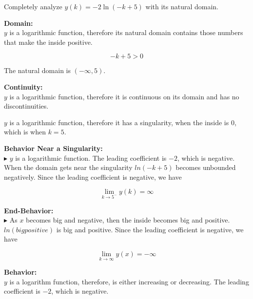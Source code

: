 \documentclass{ximera}
\author{Lee Wayand}
\begin{document}
\begin{exercise}



Completely analyze $y(k) = -2 \ln(-k+5)$ with its natural domain.



\textbf{\textcolor{blue!55!black}{Domain:}}  \\

$y$ is a logarithmic function, therefore its natural domain contains those numbers that make the inside positive. 

\[
-k + 5 > 0
\]

The natural domain is $(-\infty, 5)$.




\textbf{\textcolor{blue!55!black}{Continuity:}}  \\

$y$ is a logarithmic function, therefore it is continuous on its domain and has no discontinuities.


$y$ is a logarithmic function, therefore it has a singularity, when the inside is $0$, which is when $k = 5$.




\textbf{\textcolor{blue!55!black}{Behavior Near a Singularity:}}  \\



$\blacktriangleright$ $y$ is a logarithmic function. The leading coefficient is $-2$, which is negative.  When the domain gets near the singularity $ln(-k+5)$ becomes unbounded negatively.  Since the leading coefficient is negative, we have

\[
\lim\limits_{k \to 5^-} y(k) = \infty
\]





\textbf{\textcolor{blue!55!black}{End-Behavior:}}  \\


$\blacktriangleright$ As $x$ becomes big and negative, then the inside becomes big and positive.  $ln(big positive)$  is big and positive.  Since the leading coefficient is negative, we have

\[
\lim\limits_{k \to \infty} y(x) = -\infty
\]








\textbf{\textcolor{blue!55!black}{Behavior:}}  \\

$y$ is a logarithm function, therefore, is either increasing or decreasing.  The leading coefficient is $-2$, which is negative.  



\end{exercise}
\end{document}
